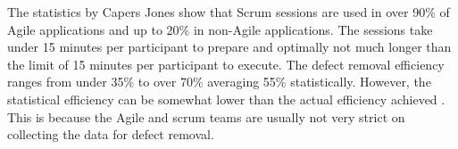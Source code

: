 The statistics by Capers Jones show that Scrum sessions are used in over 90\% of Agile applications and up to 20\% in non-Agile applications. The sessions take under 15 minutes per participant to prepare and optimally not much longer than the limit of 15 minutes per participant to execute. The defect removal efficiency ranges from under 35\% to over 70\% averaging 55\% statistically. However, the statistical efficiency can be somewhat lower than the actual efficiency achieved . This is because the Agile and scrum teams are usually not very strict on collecting the data for defect removal.